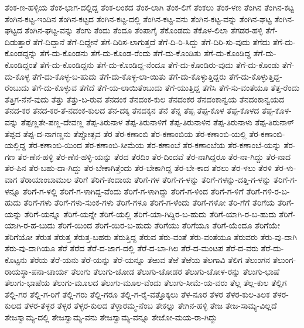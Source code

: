 ತೆಂಕ-ಣ-ಹಳ್ಳಿಯ
ತೆಂಕ-ಭಾಗ-ದಲ್ಲಿದ್ದ
ತೆಂಕ-ಲಂಕದ
ತೆಂಕ-ಲಾಗಿ
ತೆಂಕ-ಲಿಗೆ
ತೆಂಕಲು
ತೆಂಕ-ಳಣ
ತೆಂಗಿನ
ತೆಂಗಿನ-ಕಟ್ಟ
ತೆಂಗಿನ-ಕಟ್ಟ-ಇಂದಿನ
ತೆಂಗಿನ-ಕಟ್ಟದ
ತೆಂಗಿನ-ಕಟ್ಟ-ದಲ್ಲಿ
ತೆಂಗಿನ-ಕಟ್ಟ-ವನು
ತೆಂಗಿನ-ಕಟ್ಟ-ವನ್ನು
ತೆಂಗಿನ-ಘಟ್ಟ
ತೆಂಗಿನ-ಘಟ್ಟದ
ತೆಂಗಿನ-ಘಟ್ಟ-ವನ್ನು
ತೆಂಗು
ತೆಂದು
ತೆಂದೂ
ತೆಂಪಾಗೈ
ತೆಕೊಂಡದು
ತೆಕೊಳ-ಲಿಲಾ
ತೆಗಡರ-ಹಳ್ಳಿ
ತೆಗೆ-ದಿಡುತ್ತಾರೆ
ತೆಗೆ-ದಿದ್ದಾನೆ
ತೆಗೆ-ದಿದ್ದೇನೆ
ತೆಗೆ-ದಿರಿಸ-ಲಾಗುತ್ತದೆ
ತೆಗೆ-ದಿ-ರಿ-ಸಿದ್ದು
ತೆಗೆ-ದಿರಿ-ಸು-ವುದು
ತೆಗೆದು
ತೆಗೆ-ದು-ಕೊಂಡದ್ದನ್ನು
ತೆಗೆ-ದು-ಕೊಂಡನು
ತೆಗೆ-ದು-ಕೊಂಡ-ರೆಂದು
ತೆಗೆ-ದು-ಕೊಂಡಿತು
ತೆಗೆ-ದು-ಕೊಂಡಿದ್ದ
ತೆಗೆ-ದು-ಕೊಂಡಿದ್ದಂತೆ
ತೆಗೆ-ದು-ಕೊಂಡಿದ್ದನು
ತೆಗೆ-ದು-ಕೊಂಡಿದ್ದ-ನೆಂದೂ
ತೆಗೆ-ದು-ಕೊಂಡಿರು-ವುದು
ತೆಗೆ-ದು-ಕೊಂಡು
ತೆಗೆ-ದು-ಕೊಳ್ಳ
ತೆಗೆ-ದು-ಕೊಳ್ಳ-ಬ-ಹುದು
ತೆಗೆ-ದು-ಕೊಳ್ಳ-ಲಾ-ಯಿತು
ತೆಗೆ-ದು-ಕೊಳ್ಳುತ್ತಿದ್ದರು
ತೆಗೆ-ದು-ಕೊಳ್ಳುತ್ತಿದ್ದ-ರೆಂಬುದು
ತೆಗೆ-ದು-ಕೊಳ್ಳುವ
ತೆಗೆದೆ
ತೆಗೆ-ಯ-ಲಾಯಿತೆಂಬುದು
ತೆಗೆ-ಯುತ್ತಿದ್ದ
ತೆಗೆಸಿ
ತೆಗೆ-ಸು-ವಂತೆಯೂ
ತೆತ್ತ-ರೆಂದು
ತೆತ್ತಿಗ-ನೆನೆ-ವುದು
ತೆತ್ತು
ತೆತ್ತು-ಬ-ರುವ
ತೆನದಂಕ
ತೆನದಂಕ-ಕುಲ
ತೆನದಂಕರ
ತೆನದಂಕಾನ್ವಯ
ತೆನದಂಕಾನ್ವಯದ
ತೆನದ-ಕರ
ತೆನದ-ಕರ-ತೆ-ನದಂಕ-ಕುಲದ
ತೆನ-ದಕ್ಕ
ತೆನದಕ್ಕನ
ತೆನೆ
ತೆನ್ನ
ತೆಪ್ಪ
ತೆಪ್ಪ-ಕೊಳ
ತೆಪ್ಪ-ಕೊಳದ
ತೆಪ್ಪ-ಕೊಳ-ವನ್ನು
ತೆಪ್ಪಣ್ಣತೇ-ಪಣ್ಣ-ದೇವಣ್ಣ
ತೆಪ್ಪ-ತಿರುನಾಳ
ತೆಪ್ಪ-ತಿರುನಾಳಿಗೆ
ತೆಪ್ಪ-ತಿರುನಾಳಿನ
ತೆಪ್ಪ-ತಿರುನಾಳು
ತೆಪ್ಪ-ತಿರುನಾಳ್
ತೆಪ್ಪದ
ತೆಪ್ಪ-ದ-ನಾಗಣ್ಣನು
ತೆಪ್ಪೋತ್ಸವ
ತೆರ
ತೆರ-ಕಣಾಂಬಿ
ತೆರ-ಕಣಾಂಬಿಯ
ತೆರ-ಕಣಾಂಬಿ-ಯಲ್ಲಿ
ತೆರ-ಕಣಾಂಬಿ-ಯಲ್ಲಿದ್ದ
ತೆರ-ಕಣಾಂಬಿ-ಯಿಂದ
ತೆರ-ಕಣಾಂಬಿ-ಸೀಮೆಯ
ತೆರ-ಕಣಾಂಬೆ
ತೆರ-ಕಣಾಂಬೆಯ
ತೆರ-ಕಣಾಂಬೆ-ಯನ್ನು
ತೆರ-ಗಣ
ತೆರ-ಣೆನ-ಹಳ್ಳಿ
ತೆರ-ಣೆನ-ಹಳ್ಳಿ-ಯನ್ನು
ತೆರದ
ತೆರದಿಂ
ತೆರ-ದಿಂದವೆ
ತೆರ-ನಾಗಿದ್ದರೂ
ತೆರ-ನಾ-ಗಿದ್ದು
ತೆರ-ನಾದ
ತೆರ-ಪಿನ
ತೆರ-ಬಹು-ದಾ-ಗಿದ್ದು
ತೆರ-ಬೇಕಾಗಿತ್ತೆಂದು
ತೆರ-ಬೇಕಾಗಿದ್ದ
ತೆರ-ಬೇ-ಕಾದ
ತೆರಲು
ತೆರ-ಳಲು
ತೆರಳಿ
ತೆರ-ಳು-ವಾಗ
ತೆರಾಯಾಂಬಾಮುಲ
ತೆರಿಗೆ
ತೆರಿಗೆ-ಕಂದಾಯ
ತೆರಿಗೆ-ಗಳ
ತೆರಿಗೆ-ಗ-ಳನ್ನು
ತೆರಿಗೆ-ಗಳನ್ನು-ದತ್ತಿ-ಗ-ಳನ್ನು
ತೆರಿಗೆ-ಗ-ಳನ್ನೂ
ತೆರಿಗೆ-ಗ-ಳಲ್ಲಿ
ತೆರಿಗೆ-ಗ-ಳಾಗಿದ್ದ-ವೆಂದು
ತೆರಿಗೆ-ಗ-ಳಾಗಿದ್ದು
ತೆರಿಗೆ-ಗ-ಳಿಂದ
ತೆರಿಗೆ-ಗ-ಳಿಗೆ
ತೆರಿಗೆ-ಗಳಿ-ರ-ಬ-ಹುದು
ತೆರಿಗೆ-ಗಳು
ತೆರಿಗೆ-ಗಳು-ಸುಂಕ-ಗಳು
ತೆರಿಗೆ-ಗಳೂ
ತೆರಿಗೆ-ಗ-ಳೆಂದು
ತೆರಿಗೆ-ಗಳೋ
ತೆರಿ-ಗೆಗೆ
ತೆರಿಗೆಯ
ತೆರಿಗೆ-ಯನ್ನು
ತೆರಿಗೆ-ಯನ್ನೂ
ತೆರಿಗೆ-ಯನ್ನೇ
ತೆರಿಗೆ-ಯಲ್ಲಿ
ತೆರಿಗೆ-ಯಾ-ಗಿದ್ದಿರ-ಬ-ಹುದು
ತೆರಿಗೆ-ಯಾಗಿ-ರ-ಬ-ಹುದು
ತೆರಿಗೆ-ಯಾಗಿ-ರ-ಹ-ಬುದು
ತೆರಿಗೆ-ಯಿಂದ
ತೆರಿಗೆ-ಯಿರ-ಬ-ಹುದು
ತೆರಿಗೆಯು
ತೆರಿಗೆಯೂ
ತೆರಿಗೆ-ಯೆಂದೂ
ತೆರಿಗೆಯೇ
ತೆರಿಗೆಯೋ
ತೆರುತ
ತೆರುತ್ತ
ತೆರುತ್ತ-ಬಹರು
ತೆರುತ್ತಿದ್ದ
ತೆರುವ
ತೆರು-ವಂತೆ
ತೆರು-ವಂತೆಯೂ
ತೆರುವರು
ತೆರು-ವು-ದಾಗಿ
ತೆರು-ವು-ದಾಗಿಯೂ
ತೆರೆ
ತೆರೆದ
ತೆರೆ-ದ-ಜಾಗ-ದಲ್ಲಿ
ತೆರೆ-ದ-ಬಾ-ಗಿಲ
ತೆರೆ-ದ-ಮಂಟಪ
ತೆರೆ-ದ-ವರು
ತೆರೆ-ದು-ಕೊಟ್ಟನು
ತೆರೆಯ
ತೆರೆ-ಯನು
ತೆರೆ-ಯನ್ನು
ತೆರೆ-ಯನ್ನೂ
ತೆಱುವ
ತೆಱೆ
ತೆಱೆಯ
ತೆಲಗಾವಿ
ತೆಲಿಗ
ತೆಲುಂಗನ
ತೆಲುಂಗ-ರಾಯಸ್ಥಾ-ಪನಾ-ಚಾರ್ಯ
ತೆಲುಗು
ತೆಲುಗು-ಚೋಡ
ತೆಲುಗು-ಚೋಡರ
ತೆಲುಗು-ಚೋಳ-ರನ್ನು
ತೆಲುಗು-ಭಾಷೆ
ತೆಲುಗು-ಭಾಷೆಯ
ತೆಲುಗು-ಮೂಲದ
ತೆಲುಗು-ಮೂಲ-ವೆಂದು
ತೆಲುಗು-ಸೀಮೆ-ಯ-ವರು
ತೆಲ್ಲ
ತೆಲ್ಲ-ಕುಲ
ತೆಲ್ಲಿಗ
ತೆಲ್ಲಿ-ಗರ
ತೆಲ್ಲಿ-ಗ-ರಿಗೆ
ತೆಲ್ಲಿ-ಗರು
ತೆಲ್ಲಿ-ಗರೂ
ತೆಲ್ಲಿ-ಗ-ರೈ-ವತ್ತೊಕ್ಕಲು
ತೆಳ-ನೂರ
ತೆಳರ
ತೆಳರ-ಕುಲ-ತಿಲಕ
ತೆಳರ-ಕುಲದ
ತೆಳರ-ತೆಳ್ಳರ
ತೆಳ್ಳರ
ತೆಳ್ಳರ-ಕುಲದ
ತೆಳ್ಳಾರಮ್ಮ-ನೆಂಬ
ತೇಕಲ್ಲು
ತೇಗಿನ-ಹಳ್ಳಿ
ತೇಜ
ತೇಜ-ಸಾಮ್ಯ-ವಿಲ್ಲದೆ
ತೇಜಸ್ವಾಮ್ಯ-ದಲ್ಲಿ
ತೇಜಸ್ವಾಮ್ಯ-ವನು
ತೇಜಸ್ವಾಮ್ಯ-ವನ್ನೂ
ತೇಜೋ-ಮಯ-ರಾ-ಗಿದ್ದು
